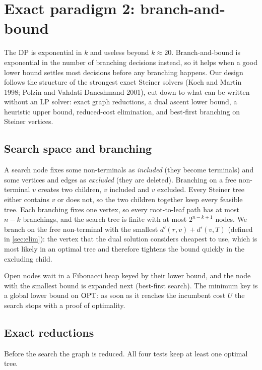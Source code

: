 \section{Exact paradigm 2: branch-and-bound}\label{sec:bnb}

The DP is exponential in \(k\) and useless beyond \(k\approx20\). Branch-and-bound is exponential in the number of branching
decisions instead, so it helps when a good lower bound settles most decisions before any branching happens. Our design follows the
structure of the strongest exact Steiner solvers (Koch and Martin 1998; Polzin and Vahdati Daneshmand 2001), cut down to what can be
written without an LP solver: exact graph reductions, a dual ascent lower bound, a heuristic upper bound, reduced-cost
elimination, and best-first branching on Steiner vertices.

\subsection{Search space and branching}
A search node fixes some non-terminals as \emph{included} (they become terminals) and some vertices and edges as \emph{excluded}
(they are deleted). Branching on a free non-terminal \(v\) creates two children, \(v\) included and \(v\) excluded. Every Steiner tree
either contains \(v\) or does not, so the two children together keep every feasible tree. Each branching fixes one vertex, so every
root-to-leaf path has at most \(n-k\) branchings, and the search tree is finite with at most \(2^{n-k+1}\) nodes. We branch on the free
non-terminal with the smallest \(d'(r,v)+d'(v,T)\) (defined in \cref{sec:elim}): the vertex that the dual solution considers cheapest
to use, which is most likely in an optimal tree and therefore tightens the bound quickly in the excluding child.

Open nodes wait in a Fibonacci heap keyed by their lower bound, and the node with the smallest bound is expanded next
(best-first search). The minimum key is a global lower bound on \(\mathrm{OPT}\): as soon as it reaches the incumbent cost \(U\) the search
stops with a proof of optimality.

\subsection{Exact reductions}
Before the search the graph is reduced. All four tests keep at least one optimal tree.

